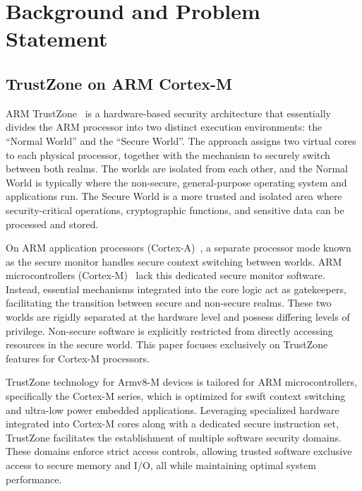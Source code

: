 \section{Background and Problem Statement } \label{sect:problem}

\subsection{TrustZone on ARM Cortex-M}

ARM TrustZone~\cite{DemystifyingAT, TZArchitecture} is a hardware-based
security architecture that essentially divides the ARM processor into two
distinct execution environments: the ``Normal World'' and the ``Secure
World''. The approach assigns two virtual cores to each physical processor,
together with the mechanism to securely switch between both realms. The
worlds are isolated from each other, and the Normal World is typically
where the non-secure, general-purpose operating system and applications
run. The Secure World is a more trusted and isolated area where
security-critical operations, cryptographic functions, and sensitive data
can be processed and stored.

On ARM application processors (Cortex-A)~\cite{TZA}, a separate processor
mode known as the secure monitor handles secure context switching between
worlds. ARM microcontrollers (Cortex-M)~\cite{TZM} lack this dedicated
secure monitor software. Instead, essential mechanisms integrated into the
core logic act as gatekeepers, facilitating the transition between secure
and non-secure realms. These two worlds are rigidly separated at the
hardware level and possess differing levels of privilege. Non-secure
software is explicitly restricted from directly accessing resources in the
secure world. This paper focuses exclusively on TrustZone features for
Cortex-M processors.

TrustZone technology for Armv8-M devices is tailored for ARM
microcontrollers, specifically the Cortex-M series, which is optimized for
swift context switching and ultra-low power embedded applications.
Leveraging specialized hardware integrated into Cortex-M cores along with a
dedicated secure instruction set, TrustZone facilitates the establishment
of multiple software security domains. These domains enforce strict access
controls, allowing trusted software exclusive access to secure memory and
I/O, all while maintaining optimal system performance.

